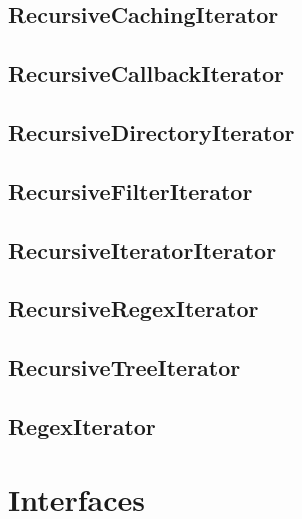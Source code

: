 \section{RecursiveCachingIterator}


\section{RecursiveCallbackIterator}


\section{RecursiveDirectoryIterator}


\section{RecursiveFilterIterator}


\section{RecursiveIteratorIterator}


\section{RecursiveRegexIterator}


\section{RecursiveTreeIterator}


\section{RegexIterator}

























\chapter{Interfaces}

